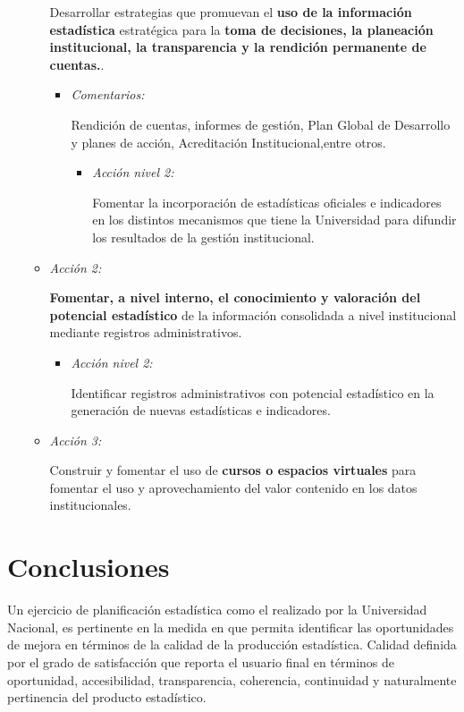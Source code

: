 \documentclass[
]{book}
\begin{document}
\begin{itemize}
\begin{itemize}
    Desarrollar estrategias que promuevan el \textbf{uso de la información estadística} estratégica para la \textbf{toma de decisiones, la planeación institucional, la transparencia y la rendición permanente de cuentas.}.

    \begin{itemize}
    \item
      \emph{Comentarios:}

      Rendición de cuentas, informes de gestión, Plan Global de Desarrollo y planes de acción, Acreditación Institucional,entre otros.

      \begin{itemize}
      \item
        \emph{Acción nivel 2:}

        Fomentar la incorporación de estadísticas oficiales e indicadores en los distintos mecanismos que tiene la Universidad para difundir los resultados de la gestión institucional.
      \end{itemize}
    \end{itemize}
  \item
    \emph{Acción 2:}

    \textbf{Fomentar, a nivel interno, el conocimiento y valoración del potencial estadístico} de la información consolidada a nivel institucional mediante registros administrativos.

    \begin{itemize}
    \item
      \emph{Acción nivel 2:}

      Identificar registros administrativos con potencial estadístico en la generación de nuevas estadísticas e indicadores.
    \end{itemize}
  \item
    \emph{Acción 3:}

    Construir y fomentar el uso de \textbf{cursos o espacios virtuales} para fomentar el uso y aprovechamiento del valor contenido en los datos institucionales.
  \end{itemize}
\end{itemize}

\hypertarget{conclusiones}{%
\chapter{Conclusiones}\label{conclusiones}}

Un ejercicio de planificación estadística como el realizado por la Universidad Nacional, es pertinente en la medida en que permita identificar las oportunidades de mejora en términos de la calidad de la producción estadística. Calidad definida por el grado de satisfacción que reporta el usuario final en términos de oportunidad, accesibilidad, transparencia, coherencia, continuidad y naturalmente pertinencia del producto estadístico.
\end{document}
